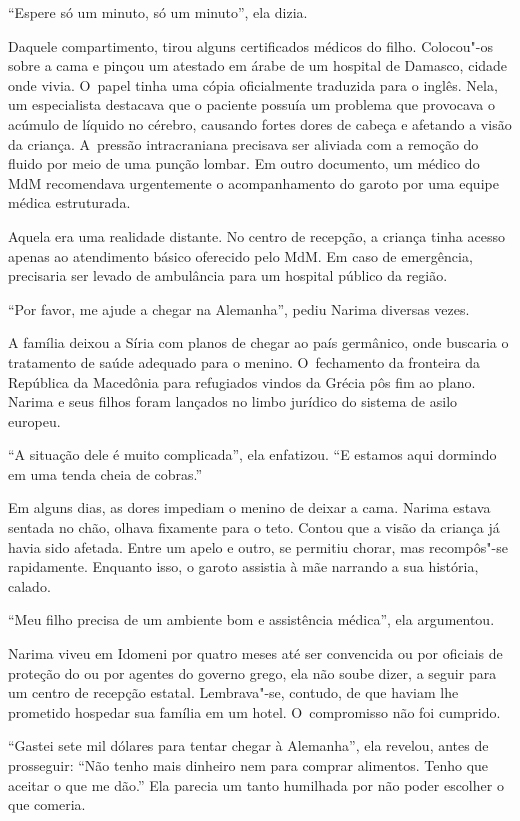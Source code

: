 ``Espere só um minuto, só um minuto'', ela dizia.

Daquele compartimento, tirou alguns certificados médicos do filho.
Colocou"-os sobre a cama e pinçou um atestado em árabe de um hospital de
Damasco, cidade onde vivia. O~papel tinha uma cópia oficialmente
traduzida para o inglês. Nela, um especialista destacava que o paciente
possuía um problema que provocava o acúmulo de líquido no cérebro,
causando fortes dores de cabeça e afetando a visão da criança. A~pressão
intracraniana precisava ser aliviada com a remoção do fluido por meio de
uma punção lombar. Em outro documento, um médico do MdM recomendava urgentemente o
acompanhamento do garoto por uma equipe médica estruturada.

Aquela era uma realidade distante. No centro de recepção, a criança
tinha acesso apenas ao atendimento básico oferecido pelo MdM. Em caso de
emergência, precisaria ser levado de ambulância para um hospital público
da região.

``Por favor, me ajude a chegar na Alemanha'', pediu Narima diversas
vezes.

A família deixou a Síria com planos de chegar ao país germânico, onde
buscaria o tratamento de saúde adequado para o menino. O~fechamento da
fronteira da República da Macedônia para refugiados vindos da Grécia pôs
fim ao plano. Narima e seus filhos foram lançados no limbo jurídico do
sistema de asilo europeu.

``A situação dele é muito complicada'', ela enfatizou. ``E estamos aqui
dormindo em uma tenda cheia de cobras.''

Em alguns dias, as dores impediam o menino de deixar a cama. Narima
estava sentada no chão, olhava fixamente para o teto. Contou que a visão
da criança já havia sido afetada. Entre um apelo e outro, se permitiu
chorar, mas recompôs"-se rapidamente. Enquanto isso, o garoto assistia à
mãe narrando a sua história, calado.

``Meu filho precisa de um ambiente bom e assistência médica'', ela argumentou. 

Narima viveu em Idomeni por quatro meses até ser convencida ou por oficiais de proteção do  ou por agentes do governo grego, ela não soube dizer,  a seguir
para um centro de recepção estatal. Lembrava"-se, contudo,
de que haviam lhe prometido hospedar sua família em um hotel. O~compromisso não foi cumprido.

``Gastei sete mil dólares para tentar chegar à Alemanha'', ela revelou, antes de prosseguir: ``Não tenho mais dinheiro nem para comprar alimentos. Tenho que aceitar
o que me dão.'' Ela parecia um tanto humilhada por não poder
escolher o que comeria.

